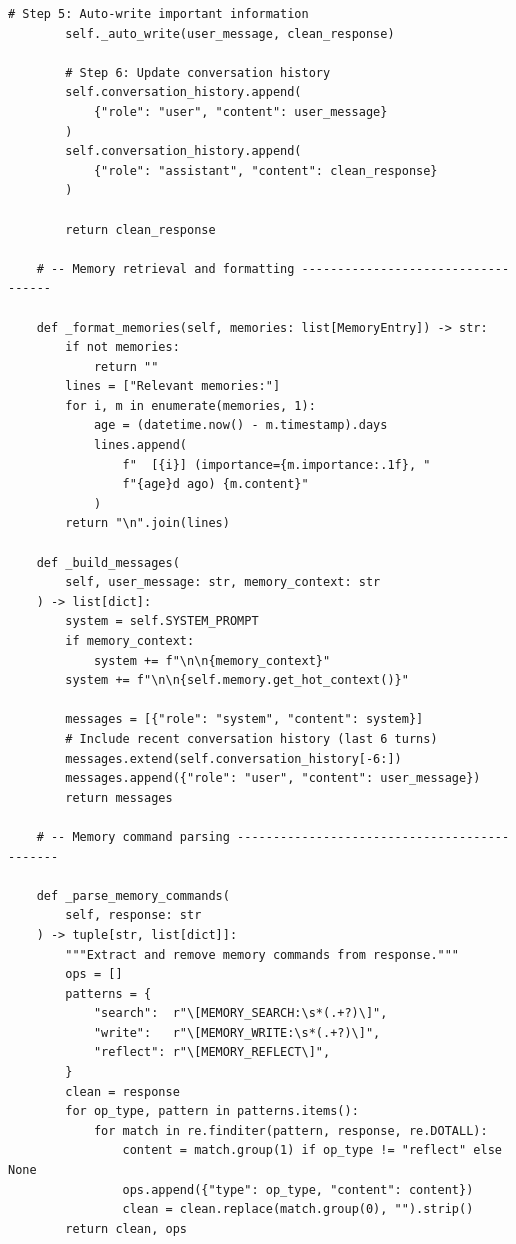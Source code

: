 \begin{lstlisting}[style=pythonstyle, caption={Complete memory-augmented agent loop with read-act-reflect-write cycle.}]
        # Step 5: Auto-write important information
        self._auto_write(user_message, clean_response)

        # Step 6: Update conversation history
        self.conversation_history.append(
            {"role": "user", "content": user_message}
        )
        self.conversation_history.append(
            {"role": "assistant", "content": clean_response}
        )

        return clean_response

    # -- Memory retrieval and formatting -----------------------------------

    def _format_memories(self, memories: list[MemoryEntry]) -> str:
        if not memories:
            return ""
        lines = ["Relevant memories:"]
        for i, m in enumerate(memories, 1):
            age = (datetime.now() - m.timestamp).days
            lines.append(
                f"  [{i}] (importance={m.importance:.1f}, "
                f"{age}d ago) {m.content}"
            )
        return "\n".join(lines)

    def _build_messages(
        self, user_message: str, memory_context: str
    ) -> list[dict]:
        system = self.SYSTEM_PROMPT
        if memory_context:
            system += f"\n\n{memory_context}"
        system += f"\n\n{self.memory.get_hot_context()}"

        messages = [{"role": "system", "content": system}]
        # Include recent conversation history (last 6 turns)
        messages.extend(self.conversation_history[-6:])
        messages.append({"role": "user", "content": user_message})
        return messages

    # -- Memory command parsing ---------------------------------------------

    def _parse_memory_commands(
        self, response: str
    ) -> tuple[str, list[dict]]:
        """Extract and remove memory commands from response."""
        ops = []
        patterns = {
            "search":  r"\[MEMORY_SEARCH:\s*(.+?)\]",
            "write":   r"\[MEMORY_WRITE:\s*(.+?)\]",
            "reflect": r"\[MEMORY_REFLECT\]",
        }
        clean = response
        for op_type, pattern in patterns.items():
            for match in re.finditer(pattern, response, re.DOTALL):
                content = match.group(1) if op_type != "reflect" else None
                ops.append({"type": op_type, "content": content})
                clean = clean.replace(match.group(0), "").strip()
        return clean, ops


\end{lstlisting}

